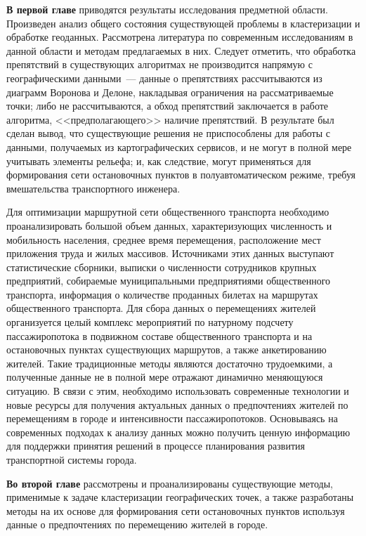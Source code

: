 \textbf{В первой главе} приводятся результаты исследования предметной области. Произведен анализ общего состояния существующей проблемы в кластеризации и обработке геоданных. Рассмотрена литература по современным исследованиям в данной области и методам предлагаемых в них. Следует отметить, что обработка препятствий в существующих алгоритмах не производится напрямую с географическими данными~--- данные о препятствиях рассчитываются из диаграмм Воронова и Делоне, накладывая ограничения на рассматриваемые точки; либо не рассчитываются, а обход препятствий заключается в работе алгоритма, <<предполагающего>> наличие препятствий. В результате был сделан вывод, что существующие решения не приспособлены для работы с данными, получаемых из картографических сервисов, и не могут в полной мере учитывать элементы рельефа; и, как следствие, могут применяться для формирования сети остановочных пунктов в полуавтоматическом режиме, требуя вмешательства транспортного инженера.

Для оптимизации маршрутной сети общественного транспорта необходимо проанализировать большой объем данных, характеризующих численность и мобильность населения, среднее время перемещения, расположение мест приложения труда и жилых массивов. Источниками этих данных выступают статистические сборники, выписки о численности сотрудников крупных предприятий, собираемые муниципальными предприятиями общественного транспорта, информация о количестве проданных билетах на маршрутах общественного транспорта. Для сбора данных о перемещениях жителей организуется целый комплекс мероприятий по натурному подсчету пассажиропотока в подвижном составе общественного транспорта и на остановочных пунктах существующих маршрутов, а также анкетированию жителей. Такие традиционные методы являются достаточно трудоемкими, а полученные данные не в полной мере отражают динамично меняющуюся ситуацию. В связи с этим, необходимо использовать современные технологии и новые ресурсы для получения актуальных данных о предпочтениях жителей по перемещениям в городе и интенсивности пассажиропотоков. Основываясь на современных подходах к анализу данных можно получить ценную информацию для поддержки принятия решений в процессе планирования развития транспортной системы города.

\textbf{Во второй главе} рассмотрены и проанализированы существующие методы, применимые к задаче кластеризации географических точек, а также разработаны методы на их основе для формирования сети остановочных пунктов используя данные о предпочтениях по перемещению жителей в городе.

